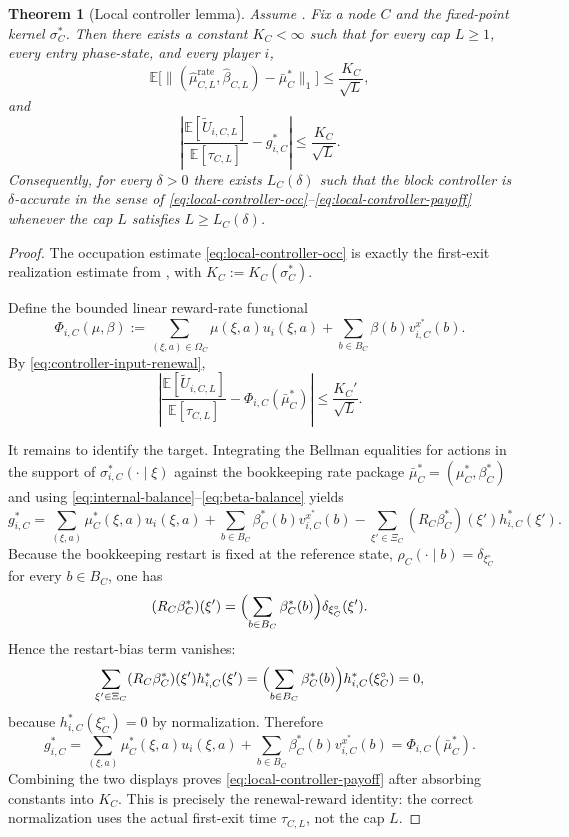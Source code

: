 \documentclass[12pt]{article}
\newtheorem{theorem}{Theorem}[section]
\theoremstyle{definition}
\newcommand{\E}{\mathbb{E}}
\newcommand{\1}{\mathbf{1}}
\begin{document}
\begin{theorem}[Local controller lemma]
\label{thm:local-controller}
Assume . Fix a node $C$ and the fixed-point kernel
$\sigma_C^*$. Then there exists a constant $K_C<\infty$ such that for every cap
$L\ge 1$, every entry phase-state, and every player $i$,
\begin{equation}
\label{eq:local-controller-occ}
\E\bigl[\|(\widehat\mu_{C,L}^{\mathrm{rate}},\widehat\beta_{C,L})-\bar\mu_C^*\|_1\bigr]
\le \frac{K_C}{\sqrt L},
\end{equation}
and
\begin{equation}
\label{eq:local-controller-payoff}
\left|
\frac{\E[\widetilde U_{i,C,L}]}{\E[\tau_{C,L}]}
-
g_{i,C}^*
\right|
\le \frac{K_C}{\sqrt L}.
\end{equation}
Consequently, for every $\delta>0$ there exists $L_C(\delta)$ such that the block
controller is $\delta$-accurate in the sense of
\eqref{eq:local-controller-occ}--\eqref{eq:local-controller-payoff} whenever the
cap $L$ satisfies $L\ge L_C(\delta)$.
\end{theorem}

\begin{proof}
The occupation estimate \eqref{eq:local-controller-occ} is exactly the first-exit
realization estimate from , with
$K_C:=K_C(\sigma_C^*)$.

Define the bounded linear reward-rate functional
\[
\Phi_{i,C}(\mu,\beta)
:=
\sum_{(\xi,a)\in\Omega_C}\mu(\xi,a)u_i(\xi,a)
+
\sum_{b\in B_C}\beta(b)v_{i,C}^{x^*}(b).
\]
By \eqref{eq:controller-input-renewal},
\[
\left|
\frac{\E[\widetilde U_{i,C,L}]}{\E[\tau_{C,L}]}
-
\Phi_{i,C}(\bar\mu_C^*)
\right|
\le \frac{K_C'}{\sqrt L}.
\]

It remains to identify the target. Integrating the Bellman equalities for actions
in the support of $\sigma_{i,C}^*(\cdot\mid\xi)$ against the bookkeeping rate
package $\bar\mu_C^*=(\mu_C^*,\beta_C^*)$ and using
\eqref{eq:internal-balance}--\eqref{eq:beta-balance} yields
\[
g_{i,C}^*
=
\sum_{(\xi,a)}\mu_C^*(\xi,a)u_i(\xi,a)
+
\sum_{b\in B_C}\beta_C^*(b)v_{i,C}^{x^*}(b)
-
\sum_{\xi'\in\Xi_C}(R_C\beta_C^*)(\xi')h_{i,C}^*(\xi').
\]
Because the bookkeeping restart is fixed at the reference state,
$\rho_C(\cdot\mid b)=\delta_{\xi_C^\circ}$ for every $b\in B_C$, one has
\[
(R_C\beta_C^*)(\xi')
=
\Bigl(\sum_{b\in B_C}\beta_C^*(b)\Bigr)\delta_{\xi_C^\circ}(\xi').
\]
Hence the restart-bias term vanishes:
\[
\sum_{\xi'\in\Xi_C}(R_C\beta_C^*)(\xi')h_{i,C}^*(\xi')
=
\Bigl(\sum_{b\in B_C}\beta_C^*(b)\Bigr)h_{i,C}^*(\xi_C^\circ)
=
0,
\]
because $h_{i,C}^*(\xi_C^\circ)=0$ by normalization. Therefore
\[
g_{i,C}^*
=
\sum_{(\xi,a)}\mu_C^*(\xi,a)u_i(\xi,a)
+
\sum_{b\in B_C}\beta_C^*(b)v_{i,C}^{x^*}(b)
=
\Phi_{i,C}(\bar\mu_C^*).
\]
Combining the two displays proves \eqref{eq:local-controller-payoff} after
absorbing constants into $K_C$. This is precisely the renewal-reward identity: the
correct normalization uses the actual first-exit time $\tau_{C,L}$, not the cap
$L$.
\end{proof}
\end{document}
